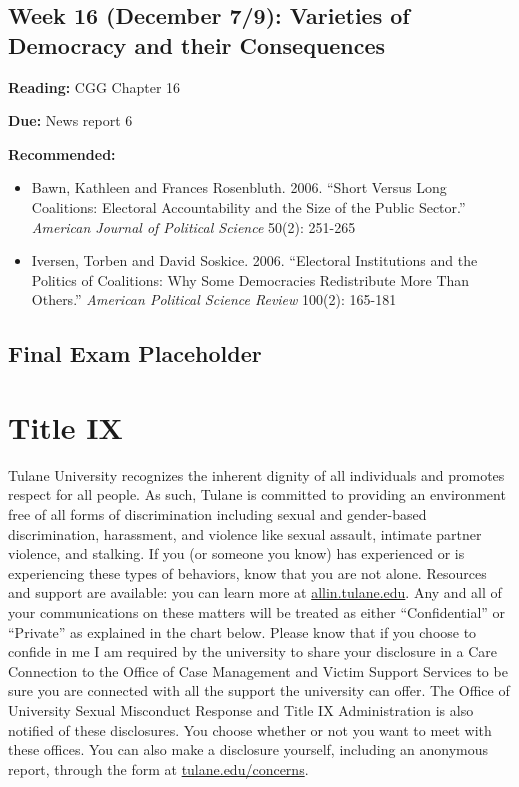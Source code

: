 \documentclass[
  11pt,
]{article}
\providecommand{\tightlist}{%
  \setlength{\itemsep}{0pt}\setlength{\parskip}{0pt}}
\begin{document}
\hypertarget{week-16-december-79-varieties-of-democracy-and-their-consequences}{%
\subsection{Week 16 (December 7/9): Varieties of Democracy and their
Consequences}\label{week-16-december-79-varieties-of-democracy-and-their-consequences}}

\textbf{Reading:} CGG Chapter 16

\textbf{Due:} News report 6

\textbf{Recommended:}

\begin{itemize}
\tightlist
\item
  Bawn, Kathleen and Frances Rosenbluth. 2006. ``Short Versus Long
  Coalitions: Electoral Accountability and the Size of the Public
  Sector.'' \emph{American Journal of Political Science} 50(2): 251-265
\item
  Iversen, Torben and David Soskice. 2006. ``Electoral Institutions and
  the Politics of Coalitions: Why Some Democracies Redistribute More
  Than Others.'' \emph{American Political Science Review} 100(2):
  165-181
\end{itemize}

\hypertarget{final-exam-placeholder}{%
\subsection{Final Exam Placeholder}\label{final-exam-placeholder}}

\newpage

\hypertarget{title-ix}{%
\section{Title IX}\label{title-ix}}

Tulane University recognizes the inherent dignity of all individuals and
promotes respect for all people. As such, Tulane is committed to
providing an environment free of all forms of discrimination including
sexual and gender-based discrimination, harassment, and violence like
sexual assault, intimate partner violence, and stalking. If you (or
someone you know) has experienced or is experiencing these types of
behaviors, know that you are not alone. Resources and support are
available: you can learn more at
\href{https://allin.tulane.edu/}{allin.tulane.edu}. Any and all of your
communications on these matters will be treated as either
``Confidential'' or ``Private'' as explained in the chart below. Please
know that if you choose to confide in me I am required by the university
to share your disclosure in a Care Connection to the Office of Case
Management and Victim Support Services to be sure you are connected with
all the support the university can offer. The Office of University
Sexual Misconduct Response and Title IX Administration is also notified
of these disclosures. You choose whether or not you want to meet with
these offices. You can also make a disclosure yourself, including an
anonymous report, through the form at
\href{https://cm.maxient.com/reportingform.php?TulaneUniv\&layout_id=0}{tulane.edu/concerns}.
\end{document}
